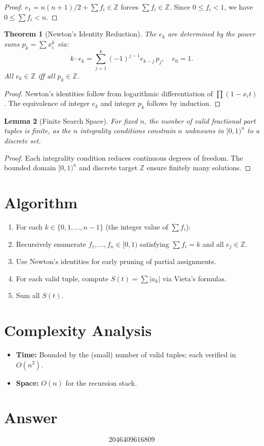 \documentclass[11pt]{article}
\newtheorem{theorem}{Theorem}
\newtheorem{lemma}[theorem]{Lemma}
\begin{document}
\begin{proof}
$e_1 = n(n+1)/2 + \sum f_i \in \mathbb{Z}$ forces $\sum f_i \in \mathbb{Z}$. Since $0 \leq f_i < 1$, we have $0 \leq \sum f_i < n$.
\end{proof}

\begin{theorem}[Newton's Identity Reduction]
The $e_k$ are determined by the power sums $p_k = \sum x_i^k$ via:
\[
k \cdot e_k = \sum_{j=1}^{k} (-1)^{j-1} e_{k-j}\, p_j, \quad e_0 = 1.
\]
All $e_k \in \mathbb{Z}$ iff all $p_k \in \mathbb{Z}$.
\end{theorem}

\begin{proof}
Newton's identities follow from logarithmic differentiation of $\prod(1 - x_i t)$. The equivalence of integer $e_k$ and integer $p_k$ follows by induction.
\end{proof}

\begin{lemma}[Finite Search Space]
For fixed $n$, the number of valid fractional part tuples is finite, as the $n$ integrality conditions constrain $n$ unknowns in $[0,1)^n$ to a discrete set.
\end{lemma}

\begin{proof}
Each integrality condition reduces continuous degrees of freedom. The bounded domain $[0,1)^n$ and discrete target $\mathbb{Z}$ ensure finitely many solutions.
\end{proof}

\section{Algorithm}
\begin{enumerate}
    \item For each $k \in \{0, 1, \ldots, n-1\}$ (the integer value of $\sum f_i$):
    \item Recursively enumerate $f_1, \ldots, f_n \in [0, 1)$ satisfying $\sum f_i = k$ and all $e_j \in \mathbb{Z}$.
    \item Use Newton's identities for early pruning of partial assignments.
    \item For each valid tuple, compute $S(t) = \sum |a_k|$ via Vieta's formulas.
    \item Sum all $S(t)$.
\end{enumerate}

\section{Complexity Analysis}
\begin{itemize}
    \item \textbf{Time:} Bounded by the (small) number of valid tuples; each verified in $O(n^2)$.
    \item \textbf{Space:} $O(n)$ for the recursion stack.
\end{itemize}

\section{Answer}

\[
\boxed{2046409616809}
\]
\end{document}
